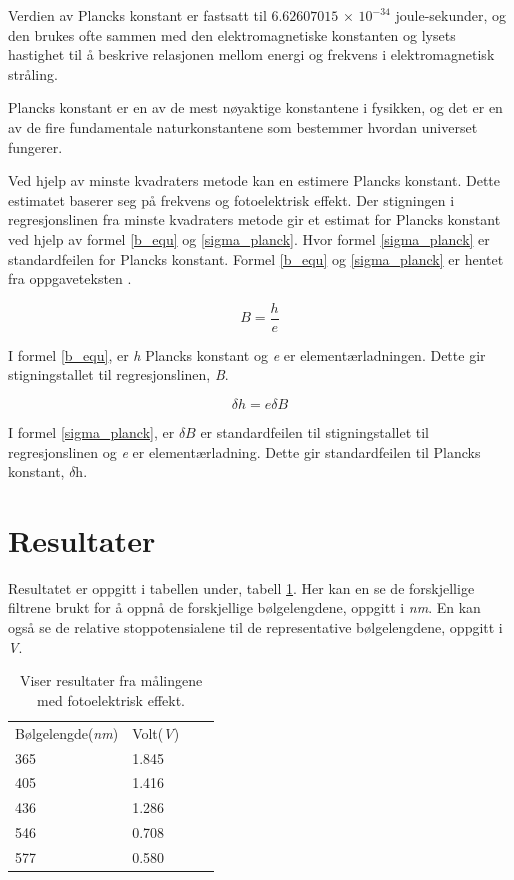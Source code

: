 \documentclass[twocolumn, 11pt]{article} %
\begin{document}
Verdien av Plancks konstant er fastsatt til $6.62607015$ × $10^{-34}$ joule-sekunder, og den brukes ofte sammen med den elektromagnetiske konstanten og lysets hastighet til å beskrive relasjonen mellom energi og frekvens i elektromagnetisk stråling.

Plancks konstant er en av de mest nøyaktige konstantene i fysikken, og det er en av de fire fundamentale naturkonstantene som bestemmer hvordan universet fungerer\cite{Planckskonstant}.


Ved hjelp av minste kvadraters metode kan en estimere Plancks konstant. Dette estimatet baserer seg på frekvens og fotoelektrisk effekt. Der stigningen i regresjonslinen fra minste kvadraters metode gir et estimat for Plancks konstant ved hjelp av formel \eqref{b_equ} og \eqref{sigma_planck}. Hvor formel \eqref{sigma_planck} er standardfeilen for Plancks konstant. Formel \eqref{b_equ} og \eqref{sigma_planck} er hentet fra oppgaveteksten \cite{oppgavetekst}.


\begin{equation}
    B = \frac{h}{e}
    \label{b_equ}
\end{equation}

I formel \eqref{b_equ}, er \textit{h} Plancks konstant og \textit{e} er elementærladningen. Dette gir stigningstallet til regresjonslinen, \textit{B}.

\begin{equation}
    \delta h = e \delta B
    \label{sigma_planck}
\end{equation}

I formel \eqref{sigma_planck}, er $\delta \textit{B}$ er standardfeilen til stigningstallet til regresjonslinen og \textit{e} er elementærladning. Dette gir standardfeilen til Plancks konstant, $\delta \textit{h}$.


\section{Resultater}

Resultatet er oppgitt i tabellen under, tabell \ref{tabell_volt}. Her kan en se de forskjellige filtrene brukt for å oppnå de forskjellige bølgelengdene, oppgitt i \textit{nm}. En kan også se de relative stoppotensialene til de representative bølgelengdene, oppgitt i \textit{V}.

\begin{table}[h]
\caption{Viser resultater fra målingene med fotoelektrisk
effekt.}
\begin{tabular}{|l|l|ll}
\cline{1-2}
Bølgelengde(\textit{nm})  &   Volt(\textit{V})   &  &  \\ \cline{1-2}
365  &   1.845   &  &  \\ \cline{1-2}
405  &   1.416   &  &  \\ \cline{1-2}
436  &   1.286   &  &  \\ \cline{1-2}
546  &   0.708   &  &  \\ \cline{1-2}
577  &   0.580   &  &  \\ \cline{1-2}

\end{tabular}
\label{tabell_volt}
\end{table}
\end{document}
